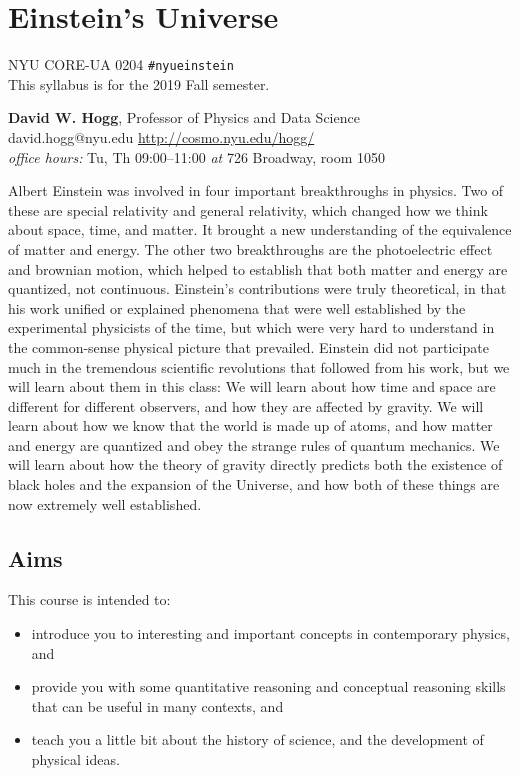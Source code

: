 \documentclass[12pt, letterpaper]{article}
\begin{document}
\sloppy\sloppypar\raggedbottom\frenchspacing

\section*{Einstein's Universe}
NYU CORE-UA 0204 \hfill \texttt{\#nyueinstein}\\
This syllabus is for the 2019 Fall semester.

\bigskip
\noindent
\textbf{David W. Hogg}, Professor of Physics and Data Science \\
david.hogg@nyu.edu \hfill \url{http://cosmo.nyu.edu/hogg/} \\
\textsl{office hours:} Tu, Th 09:00--11:00 \textsl{at} 726 Broadway, room 1050

\bigskip
\noindent
Albert Einstein was involved in four important breakthroughs in
physics.
Two of these are special relativity and general relativity, which
changed how we think about space, time, and matter. It brought a new
understanding of the equivalence of matter and energy.
The other two breakthroughs are the photoelectric effect and brownian
motion, which helped to establish that both matter and energy are quantized,
not continuous.
Einstein's contributions were truly theoretical, in that his work
unified or explained phenomena that were well established by the
experimental physicists of the time, but which were very hard to
understand in the common-sense physical picture that prevailed.
Einstein did not participate much in the tremendous scientific
revolutions that followed from his work, but we will learn about
them in this class:
We will learn about how time and space are different for different
observers, and how they are affected by gravity.
We will learn about how we know that the world is made up of atoms,
and how matter and energy are quantized and obey the strange rules of
quantum mechanics.
We will learn about how the theory of gravity directly predicts both
the existence of black holes and the expansion of the Universe, and
how both of these things are now extremely well established.

\subsection*{Aims}

This course is intended to:
\begin{itemize}
\item
introduce you to interesting and important concepts in contemporary
physics, and
\item
provide you with some quantitative reasoning and conceptual
reasoning skills that can be useful in many contexts, and
\item
teach you a little bit about the history of science,
and the development of physical ideas.
\end{itemize}
\end{document}
